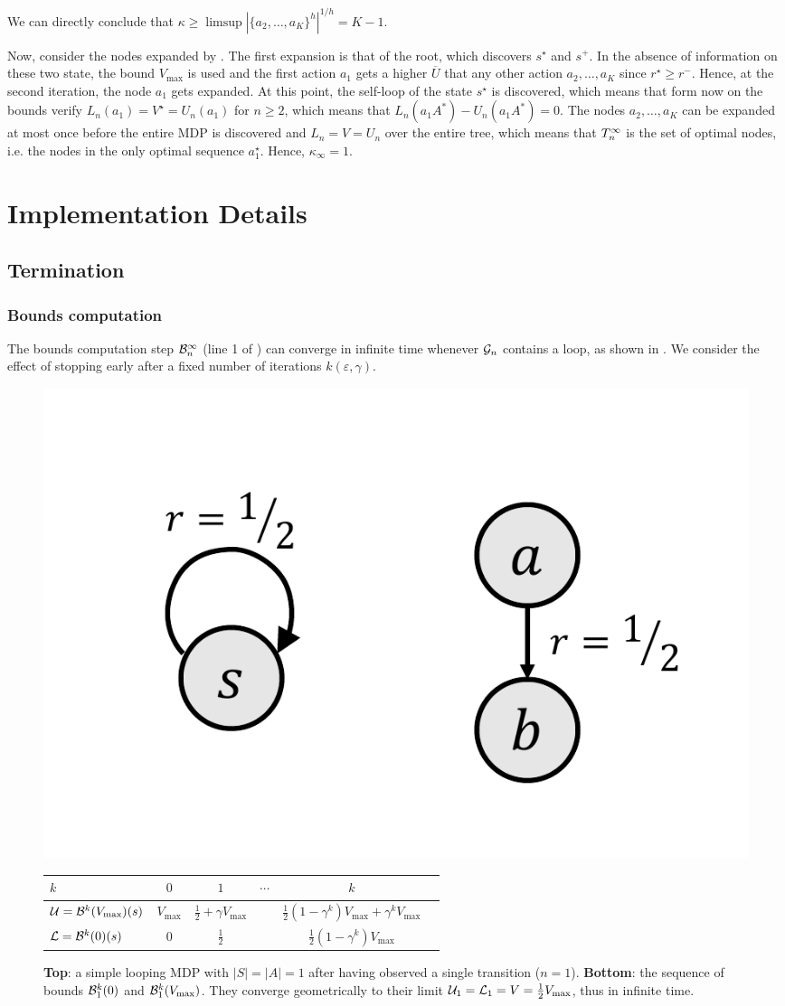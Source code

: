\documentclass[runningheads]{llncs}
\begin{document}
We can directly conclude that $\kappa \geq \limsup{|\{a_2,\dots,a_K\}^h|^{1/h}} = K-1$.

Now, consider the nodes expanded by \GBOPD. The first expansion is that of the root, which discovers $s^\star$ and $s^+$. In the absence of information on these two state, the bound $V_{\max}$ is used and the first action $a_1$ gets a higher $\overline{U}$ that any other action $a_2,\dots,a_K$ since $r^\star \geq r^-$. Hence, at the second iteration, the node $a_1$ gets expanded. At this point, the self-loop of the state $s^\star$ is discovered, which means that form now on the bounds verify $L_n(a_1) = V^\star = U_n(a_1)$ for $n\geq2$, which means that $L_n(a_1A^*)-U_n(a_1A^*) = 0$. The nodes $a_2,\dots,a_K$ can be expanded at most once before the entire MDP is discovered and $L_n=V=U_n$ over the entire tree, which means that $T_n^\infty$ is the set of optimal nodes, i.e. the nodes in the only optimal sequence $a_1^\star$. Hence, $\kappa_\infty = 1.$ 

\section{Implementation Details}
\label{sec:implementation}

\subsection{Termination}

\subsubsection{Bounds computation}

The bounds computation step $\mathcal{B}_n^\infty$ (line 1 of \GBOPD) can converge in infinite time whenever $\mathcal{G}_n$ contains a loop, as shown in . We consider the effect of stopping early after a fixed number of iterations $k(\varepsilon,\gamma)$.

\begin{figure}[th]
	\centering
	\includegraphics[trim=2.5cm 1cm 9cm 2cm, clip, width=0.1\linewidth]{img/loop.pdf}\\
	\begin{tabular}{lccccc}
		\toprule
		$k$ & $0$ & $1$ & $\cdots$ & $k$ \\
		\midrule
		$\mathcal{U} = \mathcal{B}^k(V_{\max})(s)$ & $V_{\max}$ & $\frac{1}{2} + \gamma V_{\max}$ && $\frac{1}{2}(1-\gamma^k)V_{\max} + \gamma^k V_{\max}$\\
		$\mathcal{L} = \mathcal{B}^k(0)(s)$ & $0$ & $\frac{1}{2}$ && $\frac{1}{2}(1-\gamma^k)V_{\max}$\\
		\bottomrule
	\end{tabular}
	\caption{\textbf{Top}: a simple looping MDP with $|S|=|A|=1$ after having observed a single transition ($n=1$). \textbf{Bottom}: the sequence of bounds $\mathcal{B}_1^k(0)$ and $\mathcal{B}_1^k(V_{\max})$. They converge geometrically to their limit $\mathcal{U}_1 = \mathcal{L}_1 = V = \frac{1}{2}V_{\max}$, thus in infinite time.}
	\label{fig:simple_loop}
\end{figure}
\end{document}
